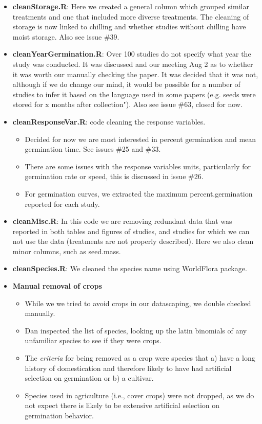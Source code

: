 \documentclass{article}[12pt]
\begin{document}
\begin{enumerate}
\begin{itemize}
\item \textbf{cleanStorage.R}: Here we created a general column which grouped similar treatments and one that included more diverse treatments. The cleaning of storage is now linked to chilling and whether studies without chilling have moist storage. Also see issue \#39.
\item \textbf{cleanYearGermination.R}: Over 100 studies do not specify what year the study was conducted. It was discussed and our meeting Aug 2 as to whether it was worth our manually checking the paper. It was decided that it was not, although if we do change our mind, it would be possible for a number of studies to infer it based on the language used in some papers (e.g. seeds were stored for x months after collection"). Also see issue \#63, closed for now.
\item \textbf{cleanResponseVar.R}: code cleaning the response variables. 
\begin{itemize}
\item Decided for now we are most interested in percent germination and mean germination time. See issues \#25 and \#33.
\item There are some issues with the response variables units, particularly for germination rate or speed, this is discussed in issue \#26.
\item For germination curves, we extracted the maximum percent.germination reported for each study.
\end{itemize}
\item \textbf{cleanMisc.R}: In this code we are removing redundant data that was reported in both tables and figures of studies, and studies for which we can not use the data (treatments are not properly described). Here we also clean minor columns, such as seed.mass. 
\item \textbf{cleanSpecies.R}: We cleaned the species name using WorldFlora package.
\end{itemize}
\begin{itemize}
\item\textbf{Manual removal of crops}
\begin{itemize}
\item While we we tried to avoid crops in our datascaping, we double checked manually.
\item Dan inspected the list of species, looking up the latin binomials of any unfamiliar species to see if they were crops.
\item The \emph{criteria} for being removed as a crop were species that a) have a long history of domestication and therefore likely to have had artificial selection on germination or b) a cultivar.
\item Species used in agriculture (i.e., cover crops) were not dropped, as we do not expect there is likely to be extensive artificial selection on germination behavior.
\end{itemize}
\end{itemize}
\end{enumerate}
\end{document}
